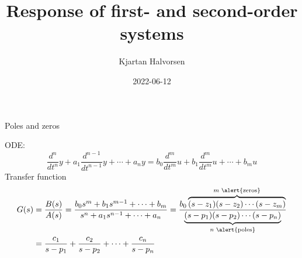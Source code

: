 \documentclass[dvisvgm,hypertex,aspectratio=169]{beamer}
\author{Kjartan Halvorsen}
\date{2022-06-12}
\title{Response of first- and second-order systems}
\begin{document}
\maketitle


\begin{frame}[label=PZ0]{Poles and zeros}

  ODE:
  \[ \frac{d^n}{dt^n}y + a_1\frac{d^{n-1}}{dt^{n-1}}y + \cdots + a_n y = b_0\frac{d^m}{dt^m}u + b_1 \frac{d^m}{dt^m}u + \cdots + b_m u \]
  Transfer function
  \begin{align*}
    G(s) &= \frac{B(s)}{A(s)} = \frac{b_0s^m + b_1s^{m-1} + \cdots + b_m }{s^n + a_1s^{n-1} + \cdots + a_n } = \frac{ b_0\overbrace{(s-z_1)(s-z_2)\cdots (s-z_m)}^{\text{\(m\) \alert{zeros}}}}{ \underbrace{(s-p_1)(s-p_2)\cdots(s-p_n)}_{\text{\(n\) \alert{poles}}}}\\
    &= \frac{c_1}{s-p_1} + \frac{c_2}{s-p_2} + \cdots +\frac{c_n}{s-p_n} 
  \end{align*}
\end{frame}
\end{document}
